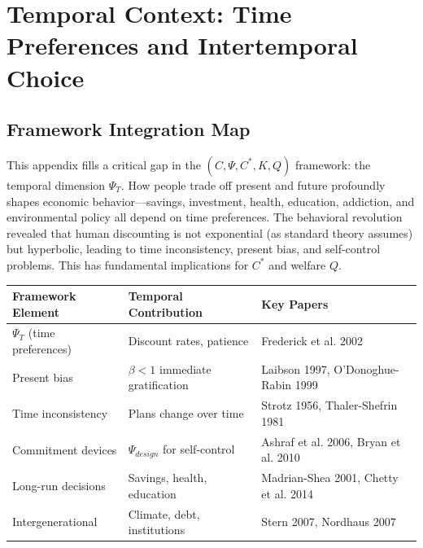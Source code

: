 \section{Temporal Context: Time Preferences and Intertemporal Choice}

\nocite{bcm_master}

\label{app:temporal-context}

\subsection{Framework Integration Map}

This appendix fills a critical gap in the $(C, \Psi, C^*, K, Q)$ framework: 
the temporal dimension $\Psi_T$. How people trade off present and future 
profoundly shapes economic behavior---savings, investment, health, education, 
addiction, and environmental policy all depend on time preferences. The 
behavioral revolution revealed that human discounting is not exponential 
(as standard theory assumes) but hyperbolic, leading to time inconsistency, 
present bias, and self-control problems. This has fundamental implications 
for $C^*$ and welfare $Q$.

\begin{center}
\renewcommand{\arraystretch}{1.4}
\begin{tabular}{|l|l|l|}
\hline
\textbf{Framework Element} & \textbf{Temporal Contribution} & \textbf{Key Papers} \\
\hline
$\Psi_T$ (time preferences) & Discount rates, patience & Frederick et al. 2002 \\
Present bias & $\beta < 1$ immediate gratification & Laibson 1997, O'Donoghue-Rabin 1999 \\
Time inconsistency & Plans change over time & Strotz 1956, Thaler-Shefrin 1981 \\
Commitment devices & $\Psi_{design}$ for self-control & Ashraf et al. 2006, Bryan et al. 2010 \\
Long-run decisions & Savings, health, education & Madrian-Shea 2001, Chetty et al. 2014 \\
Intergenerational & Climate, debt, institutions & Stern 2007, Nordhaus 2007 \\
\hline
\end{tabular}
\end{center}

